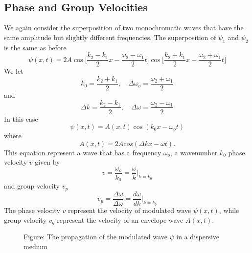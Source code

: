 \documentclass[../../../main.tex]{subfiles}
\begin{document}
\subsection{Phase and Group Velocities}
We again consider the superposition of two monochromatic waves that have the same amplitude but slightly different frequencies. The superposition of $\psi_1$ and $\psi_2$ is the same as before 
\begin{equation*}
    \psi(x,t)=2A\cos\bigg[\frac{k_2-k_1}{2}x-\frac{\omega_2-\omega_1}{2}t]\cos\bigg[\frac{k_2+k_1}{2}x-\frac{\omega_2+\omega_1}{2}t\bigg]
\end{equation*}
We let
\begin{equation*}
    k_0=\frac{k_2+k_1}{2},\quad      \Delta\omega_o=\frac{\omega_2+\omega_1}{2}
\end{equation*}
and
\begin{equation*}
    \Delta k=\frac{k_2-k_1}{2},\quad      \Delta\omega=\frac{\omega_2-\omega_1}{2}
\end{equation*}
In this case
\begin{equation*}
    \psi(x,t)=A(x, t) \cos(k_0x - \omega_ot) 
\end{equation*}
where 
\begin{equation*}
    A(x, t)=2A cos( \Delta k x- \omega t).
\end{equation*}
This equation represent a wave that has a frequency $\omega_o$, a wavenumber $k_0$ phase velocity $v$ given by
\begin{equation*}
      v=\frac{\omega_o}{k_0}=\frac{\omega}{k}\bigg|_{k=k_0}
\end{equation*}
and group velocity $v_p$
\begin{equation*}
    v_p=\frac{\Delta\omega}{\Delta\omega}=\frac{d\omega}{dk}\bigg|_{k=k_0}
\end{equation*}
The phase velocity $ v$ represent the velocity of modulated wave $\psi(x,t)$, while group velocity $v_g$ represent the velocity of an envelope wave $A(x,t)$. 

\begin{figure*}
    \centering
    \caption*{Figure: The propagation of the modulated wave $\psi$ in a dispersive medium}
\end{figure*}
\end{document}
